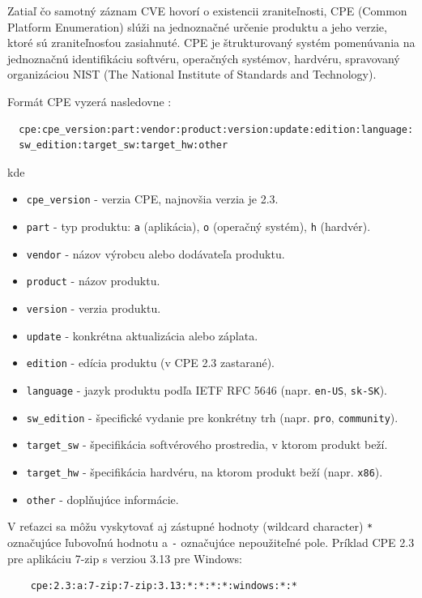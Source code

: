 Zatiaľ čo samotný záznam CVE hovorí o existencii zraniteľnosti, CPE (Common Platform Enumeration) slúži na jednoznačné 
určenie produktu a jeho verzie, ktoré sú zraniteľnosťou zasiahnuté.
CPE je štrukturovaný systém pomenúvania na jednoznačnú identifikáciu softvéru, operačných systémov, hardvéru, spravovaný
organizáciou NIST (The National Institute of Standards and Technology).

Formát CPE vyzerá nasledovne \cite{cheikes2011cpe23}:
\begin{verbatim}
  cpe:cpe_version:part:vendor:product:version:update:edition:language:
  sw_edition:target_sw:target_hw:other
\end{verbatim}
kde 
\begin{itemize}
    \item \texttt{cpe\_version} - verzia CPE, najnovšia verzia je 2.3.
    \item \texttt{part} - typ produktu: \texttt{a} (aplikácia), \texttt{o} (operačný systém), \texttt{h} (hardvér).
    \item \texttt{vendor} - názov výrobcu alebo dodávateľa produktu.
    \item \texttt{product} - názov produktu.
    \item \texttt{version} - verzia produktu.
    \item \texttt{update} - konkrétna aktualizácia alebo záplata.
    \item \texttt{edition} - edícia produktu (v CPE 2.3 zastarané).
    \item \texttt{language} - jazyk produktu podľa IETF RFC 5646 (napr. \texttt{en-US}, \texttt{sk-SK}).
    \item \texttt{sw\_edition} - špecifické vydanie pre konkrétny trh (napr. \texttt{pro}, \texttt{community}).
    \item \texttt{target\_sw} - špecifikácia softvérového prostredia, v ktorom produkt beží.
    \item \texttt{target\_hw} - špecifikácia hardvéru, na ktorom produkt beží (napr. \texttt{x86}).
    \item \texttt{other} - doplňujúce informácie.
\end{itemize}
V reťazci sa môžu vyskytovať aj zástupné hodnoty (wildcard character) \texttt{*} označujúce ľubovoľnú hodnotu a \texttt{-} označujúce nepoužiteľné pole.
Príklad CPE 2.3 pre aplikáciu 7-zip s verziou 3.13 pre Windows:
\begin{verbatim}
    cpe:2.3:a:7-zip:7-zip:3.13:*:*:*:*:windows:*:*
\end{verbatim}

